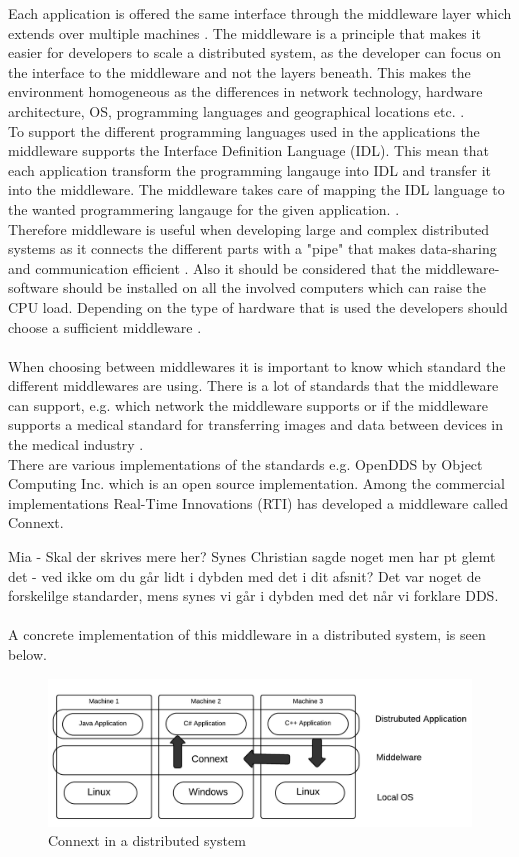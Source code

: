 \documentclass[Main]{subfiles}
\begin{document}
Each application is offered the same interface through the middleware layer which extends over multiple machines \cite[p. 3]{Tanenbaum}. The middleware is a principle that makes it easier for developers to scale a distributed system, as the developer can focus on the interface to the middleware and not the layers beneath. This makes the environment homogeneous as the differences in network technology, hardware architecture, OS, programming languages and geographical locations etc. \cite{DDS-slides} \cite[p. 68]{Coulouris}.
\\
To support the different programming languages used in the applications the middleware supports the Interface Definition Language (IDL). This mean that each application transform the programming langauge into IDL and transfer it into the middleware. The middleware takes care of mapping the IDL
language to the wanted programmering langauge for the given application. \cite{RTI}.
\\
Therefore middleware is useful when developing large and complex distributed systems as it connects the different parts with a "pipe" that makes data-sharing and communication efficient \cite{DDS-slides} \cite[p. 68]{Coulouris}. Also it should be considered that the middleware-software should be installed on all the involved computers which can raise the CPU load. Depending on the type of hardware that is used the developers should choose a sufficient middleware \cite{DDS-slides}.
\\
\\
When choosing between middlewares it is important to know which standard the different middlewares are using. There is a lot of standards that the middleware can support, e.g. which network the middleware supports or if the middleware supports a medical standard for transferring images and data between devices in the medical industry \cite{DDS_slides}.\\
There are various implementations of the standards e.g. OpenDDS by Object Computing Inc. which is an open source implementation. Among the commercial implementations Real-Time Innovations (RTI) has developed a middleware called Connext.

Mia - Skal der skrives mere her? Synes Christian sagde noget men har pt glemt det - ved ikke om du går lidt i dybden med det i dit afsnit? Det var noget de forskelilge standarder, mens synes vi går i dybden med det når vi forklare DDS.
\\\\
A concrete implementation of this middleware in a distributed system, is seen below.
\begin{figure}[hbtp]
\centering
\includegraphics[scale=0.4]{Figure/MiddelwareImplementation.png}
\caption{Connext in a distributed system}
\end{figure}
\end{document}
